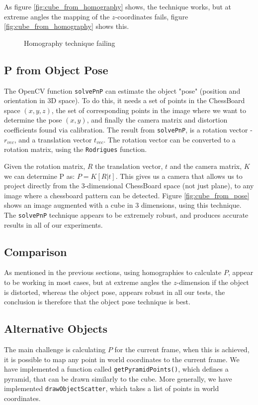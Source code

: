\documentclass[a4paper,11pt]{article}
\begin{document}
As figure \ref{fig:cube_from_homography} shows, the technique works, but at extreme angles the mapping of the $z$-coordinates fails, figure \ref{fig:cube_from_homography} shows this.\\

\begin{figure}[H]
\centering
\caption{Homography technique failing}
\label{fig:cube_from_homography_fail}
\end{figure}
\subsection{P from Object Pose}
The OpenCV function \texttt{solvePnP} can estimate the object "pose" (position and orientation in 3D space). To do this, it needs a set of points in the ChessBoard space $(x, y, z)$, the set of corresponding points in the image where we want to determine the pose $(x, y)$, and finally the camera matrix and distortion coefficients found via calibration. The result from \texttt{solvePnP}, is a rotation vector - $r_{vec}$, and a translation vector $t_{vec}$. The rotation vector can be converted to a rotation matrix, using the \texttt{Rodrigues} function.

Given the rotation matrix, $R$ the translation vector, $t$ and the camera matrix, $K$ we can determine P as: $P=K[R|t]$. This gives us a camera that allows us to project directly from the 3-dimensional ChessBoard space (not just plane), to any image where a chessboard pattern can be detected. Figure \ref{fig:cube_from_pose} shows an image augmented with a cube in 3 dimensions, using this technique.
The \texttt{solvePnP} technique appears to be extremely robust, and produces accurate results in all of our experiments.

\subsection{Comparison}
As mentioned in the previous sections, using homographies to calculate $P$, appear to be working in most cases, but at extreme angles the $z$-dimension if the object is distorted, whereas the object pose, appears robust in all our tests, the conclusion is therefore that the object pose technique is best.

\subsection{Alternative Objects}
The main challenge is calculating $P$ for the current frame, when this is achieved, it is possible to map any point in world coordinates to the current frame. We have implemented a function called \texttt{getPyramidPoints()}, which defines a pyramid, that can be drawn similarly to the cube. More generally, we have implemented \texttt{drawObjectScatter}, which takes a list of points in world coordinates.
\end{document}

